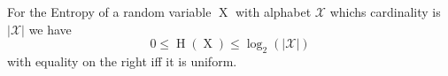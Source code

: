 For the Entropy of a random variable $\operatorname{X}$ with alphabet $\mathcal{X}$ whichs cardinality is $| \mathcal{X} |$ we have
$$0 \leq \operatorname{H}(\operatorname{X}) \leq \log_2(| \mathcal{X} |)$$ 
with equality on the right iff it is uniform.
